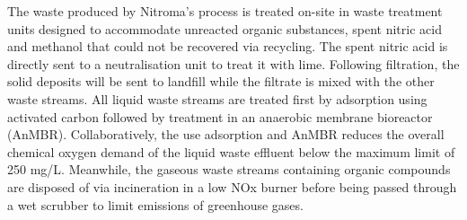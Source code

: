 The waste produced by Nitroma's process is treated on-site in waste treatment units designed to accommodate unreacted organic substances, spent nitric acid and methanol that could not be recovered via recycling. The spent nitric acid is directly sent to a neutralisation unit to treat it with lime. Following filtration, the solid deposits will be sent to landfill while the filtrate is mixed with the other waste streams. All liquid waste streams are treated first by adsorption using activated carbon followed by treatment in an anaerobic membrane bioreactor (AnMBR). Collaboratively, the use adsorption and AnMBR reduces the overall chemical oxygen demand of the liquid waste effluent below the maximum limit of 250 mg/L. Meanwhile, the gaseous waste streams containing organic compounds are disposed of via incineration in a low NOx burner before being passed through a wet scrubber to limit emissions of greenhouse gases.
